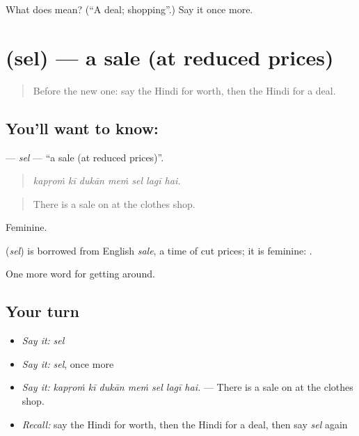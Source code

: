\begin{tcolorbox}[breakable,colback=teal!4,colframe=teal!35!black,title={Before you move on}]
What does  mean? (\textquotedblleft{}A deal; shopping\textquotedblright{}.) Say it once more.
\end{tcolorbox}
\section[\texorpdfstring{\hi{सेल} (sel)}{सेल (sel)}]{ (sel) — a sale (at reduced prices)}

\label{lesson:HI-C431-sel}



\begin{quote}
Before the new one: say the Hindi for worth, then the Hindi for a deal.
\end{quote}

\subsection*{You'll want to know: }
\textbf{} — \emph{sel} — \textquotedblleft{}a sale (at reduced prices)\textquotedblright{}.

\begin{quote}
      
\end{quote}

\begin{quote}
\emph{kapṛoṁ kī dukān meṁ sel lagī hai.}
\end{quote}

\begin{quote}
There is a sale on at the clothes shop.
\end{quote}

Feminine.

\begin{cousinweb}
\textbf{} (\emph{sel}) is borrowed from English \emph{sale}, a time of cut prices; it is feminine:   .
\end{cousinweb}

\begin{grammarlens}[title={What you've built}]
One more word for getting around.
\end{grammarlens}

\subsection*{Your turn}
\begin{itemize}
\raggedright
  \item \emph{Say it:} \emph{sel}
  \item \emph{Say it:} \emph{sel}, once more
  \item \emph{Say it:} \emph{kapṛoṁ kī dukān meṁ sel lagī hai.} — There is a sale on at the clothes shop.
  \item \emph{Recall:} say the Hindi for worth, then the Hindi for a deal, then say \emph{sel} again
\end{itemize}

